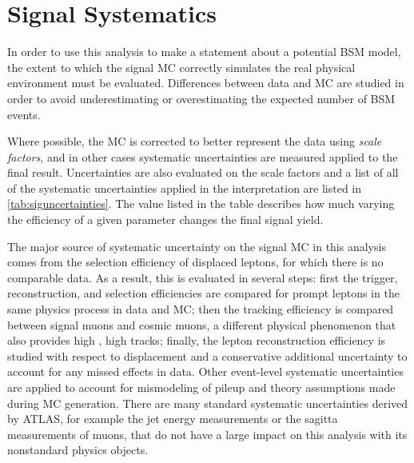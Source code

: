 \chapter{Signal Systematics}

In order to use this analysis to make a statement about a potential \ac{BSM} model, the extent to which the signal \ac{MC} correctly simulates the real physical environment must be evaluated. Differences between data and \ac{MC} are studied in order to avoid underestimating or overestimating the expected number of \ac{BSM} events. 

Where possible, the \ac{MC} is corrected to better represent the data using \emph{scale factors}, and in other cases systematic uncertainties are measured applied to the final result. Uncertainties are also evaluated on the scale factors and a list of all of the systematic uncertainties applied in the interpretation are listed in \autoref{tab:siguncertainties}. The value listed in the table describes how much varying the efficiency of a given parameter changes the final signal yield. 

The major source of systematic uncertainty on the signal \ac{MC} in this analysis comes from the selection efficiency of displaced leptons, for which there is no comparable data. As a result, this is evaluated in several steps: first the trigger, reconstruction, and selection efficiencies are compared for prompt leptons in the same physics process in data and \ac{MC}; then the tracking efficiency is compared between signal muons and cosmic muons, a different physical phenomenon that also provides high \pt, high \absdz tracks; finally, the lepton reconstruction efficiency is studied with respect to displacement and a conservative additional uncertainty to account for any missed effects in data. Other event-level systematic uncertainties are applied to account for mismodeling of pileup and theory assumptions made during \ac{MC} generation. There are many standard systematic uncertainties derived by \ac{ATLAS}, for example the jet energy measurements or the sagitta measurements of muons, that do not have a large impact on this analysis with its nonstandard physics objects.


